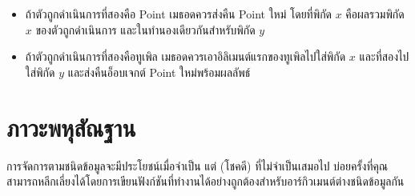 \begin{itemize}


\item  ถ้าตัวถูกดำเนินการที่สองคือ Point เมธอดควรส่งคืน Point ใหม่ โดยที่พิกัด {\scriptsize$x$} คือผลรวมพิกัด {\scriptsize$x$} ของตัวถูกดำเนินการ และในทำนองเดียวกันสำหรับพิกัด {\scriptsize$y$}


\item  ถ้าตัวถูกดำเนินการที่สองคือทูเพิล เมธอดควรเอาอิลิเมนต์แรกของทูเพิลไปใส่พิกัด {\scriptsize$x$} และที่สองไปใส่พิกัด {\scriptsize$y$} และส่งคืนอ็อบเจกต์ Point ใหม่พร้อมผลลัพธ์

\end{itemize}




\section{ภาวะพหุสัณฐาน} %
\label{polymorphism}


การจัดการตามชนิดข้อมูลจะมีประโยชน์เมื่อจำเป็น แต่ (โชคดี) ที่ไม่จำเป็นเสมอไป 
บ่อยครั้งที่คุณสามารถหลีกเลี่ยงได้โดยการเขียนฟังก์ชันที่ทำงานได้อย่างถูกต้องสำหรับอาร์กิวเมนต์ต่างชนิดข้อมูลกัน



